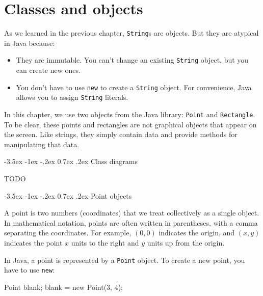 \documentclass[12pt]{book}
\title{\thetitle}
\author{\theauthors}
\date{\theversion}
\makeatletter
\renewcommand{\section}{\@startsection {section}{1}{\z@}%
    {-3.5ex \@plus -1ex \@minus -.2ex}%
    {0.7ex \@plus.2ex}%
    {\normalfont\Large\bfseries}}
\theoremstyle{exercise}
\newcommand{\java}[1]{\lstinline{#1}} %
\makeatother
\begin{document}
\setcounter{chapter}{8}


\chapter{Classes and objects}
\label{objects}


As we learned in the previous chapter, \java{String}s are objects.
But they are atypical in Java because:
\begin{itemize}

\item They are immutable.
You can't change an existing \java{String} object, but you can create new ones.

\item You don't have to use \java{new} to create a \java{String} object.
For convenience, Java allows you to assign \java{String} literals.

\end{itemize}

In this chapter, we use two objects from the Java library: \java{Point} and \java{Rectangle}.
To be clear, these points and rectangles are not graphical objects that appear on the screen.
Like strings, they simply contain data and provide methods for manipulating that data.


\section{Class diagrams}

TODO


\section{Point objects}


A point is two numbers (coordinates) that we treat collectively as a single object.
In mathematical notation, points are often written in parentheses, with a comma separating the coordinates.
For example, $(0, 0)$ indicates the origin, and $(x, y)$ indicates the point $x$ units to the right and $y$ units up from the origin.


In Java, a point is represented by a \java{Point} object.
To create a new point, you have to use \java{new}:

\begin{code}
    Point blank;
    blank = new Point(3, 4);
\end{code}
\end{document}
